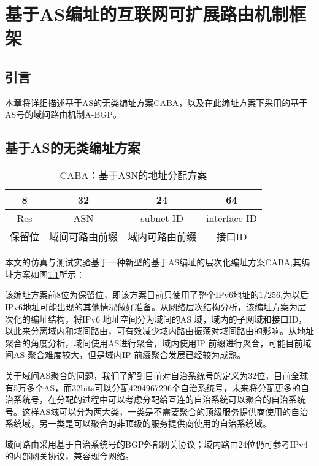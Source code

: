 

\chapter{基于AS编址的互联网可扩展路由机制框架}
\label{cha:model}

\section{引言}
    本章将详细描述基于AS的无类编址方案CABA，以及在此编址方案下采用的基于AS号的域间路由机制A-BGP。

\section{基于AS的无类编址方案}

\begin{table}[h]
    \centering
    \caption{CABA：基于ASN的地址分配方案}
    \label{tab:caba}
        \begin{tabular}{|c|c|c|c|}
        \hline
        8 & 32 & 24 & 64\\ \hline
        Res & ASN & subnet ID & interface ID\\ \hline
        保留位& 域间可路由前缀 & 域内可路由前缀 & 接口ID\\
        \hline
        \end{tabular}
\end{table}

本文的仿真与测试实验基于一种新型的基于AS编址的层次化编址方案CABA,其编址方案如图\ref{tab:caba}所示：

该编址方案前8位为保留位，即该方案目前只使用了整个IPv6地址的$1/256$,为以后IPv6地址可能出现的其他情况做好准备。从网络层次结构分析，该编址方案为层次化的编址结构，将IPv6 地址空间分为域间的AS 域，域内的子网域和接口ID，以此来分离域内和域间路由，可有效减少域内路由振荡对域间路由的影响。从地址聚合的角度分析，域间使用AS进行聚合，域内使用IP 前缀进行聚合，可能目前域间AS 聚合难度较大，但是域内IP 前缀聚合发展已经较为成熟。


关于域间AS聚合的问题，我们了解到目前对自治系统号的定义为32位，目前全球有5万多个AS，而32bits可以分配4294967296个自治系统号，未来将分配更多的自治系统号，在分配的过程中可以考虑分配给互连的自治系统可以聚合的自治系统号。这样AS域可以分为两大类，一类是不需要聚合的顶级服务提供商使用的自治系统域，另一类是可以聚合的非顶级的服务提供商使用的自治系统域。


域间路由采用基于自治系统号的BGP外部网关协议；域内路由24位仍可参考IPv4的内部网关协议，兼容现今网络。

